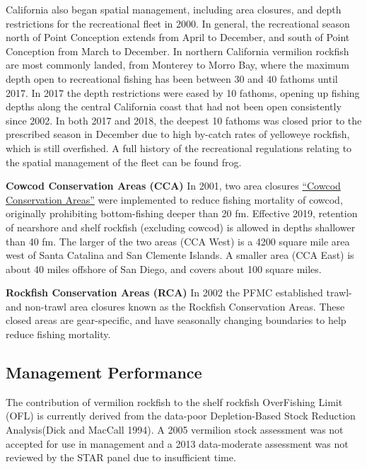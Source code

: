 \documentclass[
  english,
  a4paper,
]{article}
\begin{document}
California also began spatial management, including area closures, and depth
restrictions for the recreational fleet in 2000. In general, the recreational
season north of Point Conception
extends from April to December, and south of Point Conception from March to December.
In northern California vermilion rockfish are most commonly landed, from Monterey to Morro Bay, where the
maximum depth open to recreational fishing has been between 30 and 40
fathoms until 2017. In 2017 the depth restrictions were eased by 10 fathoms,
opening up fishing depths along the central California coast that had not been
open consistently since 2002. In
both 2017 and 2018, the deepest 10 fathoms was closed prior to the prescribed
season in December due to high by-catch rates of yelloweye rockfish, which is still
overfished. A full history of the recreational
regulations relating to the spatial management of the fleet can be found frog.

\textbf{Cowcod Conservation Areas (CCA)}
In 2001, two area closures \href{https://nrm.dfg.ca.gov/FileHandler.ashx?DocumentID=36132\&inline}{``Cowcod Conservation Areas''} were implemented to reduce fishing mortality of cowcod, originally prohibiting bottom-fishing deeper than 20 fm. Effective 2019, retention of nearshore and shelf rockfish (excluding cowcod) is allowed in depths shallower than 40 fm. The larger of the two areas (CCA West) is a 4200 square mile area west of Santa Catalina and San Clemente Islands. A smaller area (CCA East) is about 40 miles offshore of San Diego, and covers about 100 square miles.

\textbf{Rockfish Conservation Areas (RCA)}
In 2002 the PFMC established trawl- and non-trawl area closures known as the Rockfish Conservation Areas. These closed areas are gear-specific, and have seasonally changing boundaries to help reduce fishing mortality.

\hypertarget{management-performance-1}{%
\subsection{Management Performance}\label{management-performance-1}}

The contribution of vermilion rockfish to the shelf rockfish OverFishing Limit (OFL) is currently derived from the data-poor Depletion-Based Stock Reduction Analysis(Dick and MacCall 1994). A 2005
vermilion stock assessment was not accepted for use in management and a 2013 data-moderate assessment was not reviewed by the STAR panel due to insufficient time.
\end{document}
